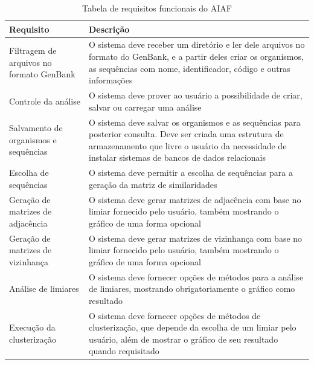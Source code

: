 \begin{table}
\centering
\caption{Tabela de requisitos funcionais do AIAF} %
\begin{tabular}{p{5cm}p{10cm}} %
\hline 
Requisito & Descrição \\ 
\hline
\hline
Filtragem de arquivos no formato GenBank & O sistema deve receber um diretório e ler dele arquivos no formato do GenBank, e a partir deles criar os
organismos, as sequências com nome, identificador, código e outras informações\\ \hline
Controle da análise & O sistema deve prover ao usuário a possibilidade de criar, salvar ou carregar uma análise \\ \hline
Salvamento de organismos e sequências & O sistema deve salvar os organismos e as sequências para posterior consulta. Deve ser criada uma estrutura de
armazenamento que livre o usuário da necessidade de instalar sistemas de bancos de dados relacionais \\ \hline
Escolha de sequências & O sistema deve permitir a escolha de sequências para a geração da matriz de similaridades \\ \hline
Geração de matrizes de adjacência & O sistema deve gerar matrizes de adjacência com base no limiar fornecido pelo usuário, também mostrando o gráfico de uma
forma opcional \\ \hline
Geração de matrizes de vizinhança & O sistema deve gerar matrizes de vizinhança com base no limiar fornecido pelo usuário, também mostrando o gráfico de uma
forma opcional \\ \hline
Análise de limiares & O sistema deve fornecer opções de métodos para a análise de limiares, mostrando obrigatoriamente o gráfico como resultado\\ \hline
Execução da clusterização & O sistema deve fornecer opções de métodos de clusterização, que depende da escolha de um limiar pelo usuário, além de mostrar
o gráfico de seu resultado quando requisitado \\ \hline

\end{tabular}
\end{table}
